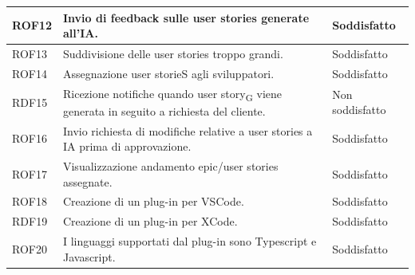 \documentclass{article}
\begin{document}
{\begin{center}
\begin{tabular}{|P{2cm}| P{10cm}| P{4cm}|}
\hline
{}
\hline
ROF12& Invio di feedback sulle user stories generate all'IA.& Soddisfatto \\
\hline
{}
ROF13&Suddivisione delle user stories troppo grandi.  & Soddisfatto\\
\hline
{}
ROF14 & Assegnazione user storieS agli sviluppatori.& Soddisfatto\\
\hline
{}
RDF15 & Ricezione notifiche quando user story\textsubscript{G} viene generata in seguito a richiesta del cliente. & Non soddisfatto\\
\hline
{}
ROF16& Invio richiesta di modifiche relative a user stories a IA prima di approvazione. & Soddisfatto\\
\hline
{}
ROF17&Visualizzazione andamento epic/user stories assegnate.& Soddisfatto\\
\hline
{}
ROF18& Creazione di un plug-in per VSCode.& Soddisfatto\\
\hline
{}
RDF19& Creazione di un plug-in per XCode.& Soddisfatto\\
\hline
{}
ROF20& I linguaggi supportati dal plug-in sono Typescript e Javascript. & Soddisfatto\\
\hline
\end{tabular}



\end{center}}
\end{document}
